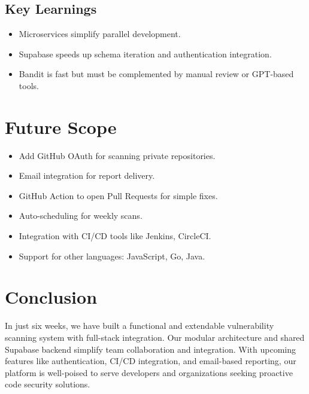 \documentclass{article}
\begin{document}
\subsection{Key Learnings}
\begin{itemize}
    \item Microservices simplify parallel development.
    \item Supabase speeds up schema iteration and authentication integration.
    \item Bandit is fast but must be complemented by manual review or GPT-based tools.
\end{itemize}

\section{Future Scope}
\begin{itemize}
    \item Add GitHub OAuth for scanning private repositories.
    \item Email integration for report delivery.
    \item GitHub Action to open Pull Requests for simple fixes.
    \item Auto-scheduling for weekly scans.
    \item Integration with CI/CD tools like Jenkins, CircleCI.
    \item Support for other languages: JavaScript, Go, Java.
\end{itemize}

\section{Conclusion}
In just six weeks, we have built a functional and extendable vulnerability scanning system with full-stack integration. Our modular architecture and shared Supabase backend simplify team collaboration and integration. With upcoming features like authentication, CI/CD integration, and email-based reporting, our platform is well-poised to serve developers and organizations seeking proactive code security solutions.
\end{document}
